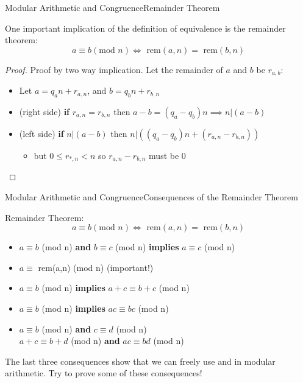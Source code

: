 \begin{frame}{Modular Arithmetic and Congruence}{Remainder Theorem}

  One important implication of the definition of equivalence is the remainder theorem:
  \begin{equation*}
    a \equiv b (\text{mod } n) \iff \text{ rem}(a,n) = \text{ rem}(b,n)
  \end{equation*}

  \begin{proof}
    Proof by two way implication. Let the remainder of $a$ and $b$ be $r_{a,b}$:

    \begin{itemize}
    \item Let $a = q_an + r_{a,n}$, and $b = q_bn + r_{b,n}$
    \item (right side) {\bf if} $r_{a,n} = r_{b,n}$ then $a-b = (q_a-q_b)n \implies n|(a-b)$
    \item (left side) {\bf if} $n|(a-b)$ then $n|((q_a-q_b)n+(r_{a,n}-r_{b,n}))$
    \begin{itemize}
      \item but $0 \leq r_{*,n} < n$ so $r_{a,n}-r_{b,n}$ must be 0
    \end{itemize}
    \end{itemize}
  \end{proof}
\end{frame}

\begin{frame}{Modular Arithmetic and Congruence}{Consequences of the Remainder Theorem}

  Remainder Theorem:
  \begin{equation*}
    a \equiv b (\text{mod } n) \iff \text{ rem}(a,n) = \text{ rem}(b,n)
  \end{equation*}

  \begin{itemize}
  \item $a \equiv b$ (mod n) {\bf and} $b \equiv c$ (mod n) {\bf implies}
    $a \equiv c$ (mod n)
  \item $a \equiv $ rem(a,n) (mod n) \hspace{1cm} (\alert{important!})\bigskip
  \item $a \equiv b$ (mod n) {\bf implies} $a+c \equiv b+c$ (mod n)
  \item $a \equiv b$ (mod n) {\bf implies} $ac \equiv bc$ (mod n)
  \item $a \equiv b$ (mod n) {\bf and} $c\equiv d$ (mod n)\\
    \hspace{2cm}{\bf implies} $a+c \equiv b+d$ (mod n) {\bf and} $ac \equiv bd$ (mod n)
  \end{itemize}\bigskip

  The last three consequences show that we can freely use  and  in modular arithmetic. Try to prove some of these consequences!
\end{frame}

